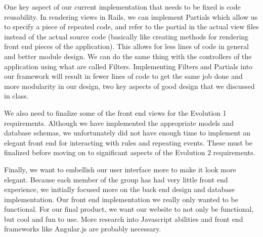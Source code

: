 \documentclass[11pt]{article}
\begin{document}
One key aspect of our current implementation that needs to be fixed is code reusability.  In rendering views in Rails, we can implement Partials which allow us to specify a piece of repeated code, and refer to the partial in the actual view files instead of the actual source code (basically like creating methods for rendering front end pieces of the application).  This allows for less lines of code in general and better module design.  We can do the same thing with the controllers of the application using what are called Filters.  Implementing Filters and Partials into our framework will result in fewer lines of code to get the same job done and more modularity in our design, two key aspects of good design that we discussed in class.

We also need to finalize some of the front end views for the Evolution 1 requirements.  Although we have implemented the appropriate models and database schemas, we unfortunately did not have enough time to implement an elegant front end for interacting with rules and repeating events.  These must be finalized before moving on to significant aspects of the Evolution 2 requirements.

Finally, we want to embellish our user interface more to make it look more elegant.  Because each member of the group has had very little front end experience, we initially focused more on the back end design and database implementation.  Our front end implementation we really only wanted to be functional.  For our final product, we want our website to not only be functional, but cool and fun to use.  More research into Javascript abilities and front end frameworks like Angular.js are probably necessary.
\end{document}
